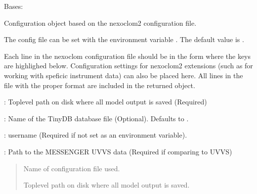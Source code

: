 \documentclass[letterpaper,10pt,english]{sphinxmanual}
\begin{document}
\begin{fulllineitems}
\label{\detokenize{nexoclom2/nexoclom2.utilities.NexoclomConfig:nexoclom2.utilities.NexoclomConfig.NexoclomConfig}}
\pysigstartsignatures
\pysigline
{}
\pysigstopsignatures
\sphinxAtStartPar
Bases: 

\sphinxAtStartPar
Configuration object based on the nexoclom2 configuration file.

\sphinxAtStartPar
The config file can be set with the environment variable .
The default value is .

\sphinxAtStartPar
Each line in the nexoclom configuration file should be in the form
 where the keys are highlighed below. Configuration
settings for nexoclom2 extensions (such as for working with speficic
instrument data) can also be placed here. All lines in the file with the
proper format are included in the returned object.

\sphinxAtStartPar
{}: Top\sphinxhyphen{}level path on disk where all model output is saved (Required)

\sphinxAtStartPar
{}: Name of the TinyDB database file (Optional). Defaults to
.

\sphinxAtStartPar
{}: username (Required if not set as an environment variable).

\sphinxAtStartPar
{}: Path to the MESSENGER UVVS data (Required if comparing to UVVS)
\begin{quote}\begin{description}
\begin{description}
\end{description}

\begin{description}
\sphinxAtStartPar
Name of configuration file used.

\sphinxAtStartPar
Top\sphinxhyphen{}level path on disk where all model output is saved.


\end{description}
\end{description}
\end{quote}
\end{fulllineitems}
\end{document}
